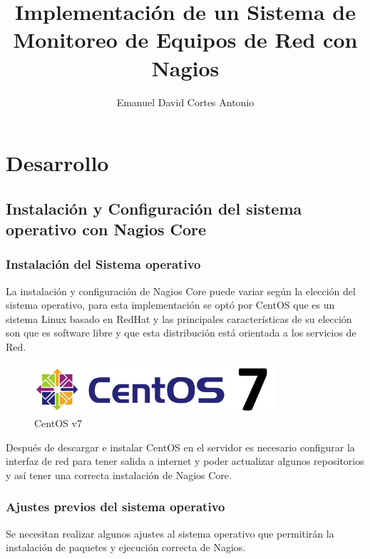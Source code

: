 \documentclass[12pt]{book}
\title{Implementación de un Sistema de Monitoreo de Equipos de Red con Nagios }
\author{Emanuel David Cortes Antonio}
\begin{document}
  \maketitle
  \tableofcontents
  
  \chapter{Desarrollo}

  \section{Instalación y Configuración del sistema operativo con Nagios Core  }
  \subsection{Instalación del Sistema operativo} 
    La instalación y configuración de Nagios Core puede variar según la elección del sistema operativo, para esta implementación se optó
    por CentOS que es un sistema Linux basado en RedHat y las principales características de su elección son que es software libre y que
    esta distribución está orientada a los servicios de Red.
    \begin{figure}[htb]
      \centering
        \includegraphics[width=0.8\textwidth]{./Imagenes/centos-7-logo}
      \caption{CentOS v7} \label{fig:CentOS}
    \end{figure}

    Después de descargar e instalar CentOS en el servidor es necesario configurar la interfaz de red para tener salida a internet y poder
    actualizar algunos repositorios y así tener una correcta instalación de Nagios Core.
    \vspace{-5mm}
    \begin{alltt} 
      
    \end{alltt}
  \subsection{Ajustes previos del sistema operativo }
    Se necesitan realizar algunos ajustes al sistema operativo que permitirán la instalación de paquetes y ejecución correcta de Nagios.
    \begin{alltt}
      
    \end{alltt} 
\end{document}

